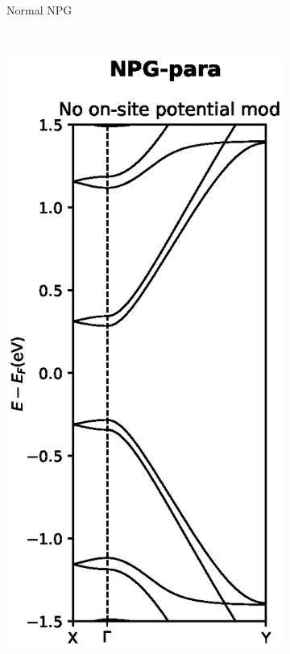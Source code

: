 \begin{figure}[h]
\begin{subfigure}[b]{0.3\textwidth}
		\caption{Normal NPG}
		\label{Fabbs}
	\end{subfigure}
	~ %
	\begin{subfigure}[b]{0.3\textwidth}
		\includegraphics[width=\textwidth]{Figures/paraNPGBS.eps}

\end{subfigure}
\end{figure}
